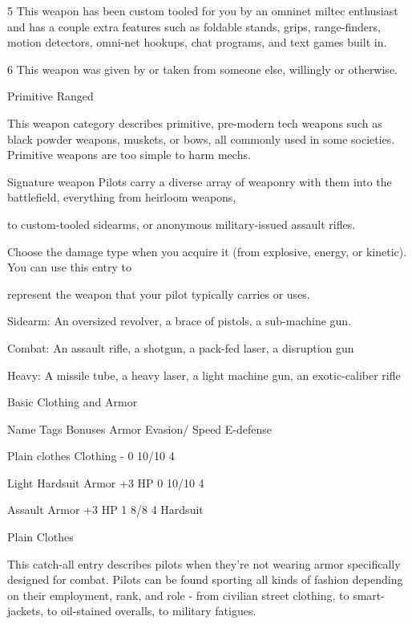  5       This weapon has been custom tooled for you by an omninet miltec enthusiast and has a couple extra  
         features such as foldable stands, grips, range-finders, motion detectors, omni-net hookups, chat programs,  
         and text games built in. 

 6       This weapon was given by or taken from someone else, willingly or otherwise. 

Primitive Ranged  

This weapon category describes primitive, pre-modern tech weapons such as black powder weapons,  
muskets, or bows, all commonly used in some societies. Primitive weapons are too simple to harm mechs.
 

Signature weapon  
Pilots carry a diverse array of weaponry with them into the battlefield, everything from heirloom weapons,  

to custom-tooled sidearms, or anonymous military-issued assault rifles. 
 

Choose the damage type when you acquire it (from explosive, energy, or kinetic). You can use this entry to  

represent the weapon that your pilot typically carries or uses. 
 

Sidearm: An oversized revolver, a brace of pistols, a sub-machine gun.
 

Combat: An assault rifle, a shotgun, a pack-fed laser, a disruption gun
 
Heavy: A missile tube, a heavy laser, a light machine gun, an exotic-caliber rifle
 

                                             Basic Clothing and Armor
 

    Name                Tags                Bonuses                              Armor        Evasion/         Speed 
                                                                                              E-defense 

    Plain clothes       Clothing            -                                    0            10/10            4 

    Light Hardsuit      Armor               +3 HP                                0            10/10            4 

    Assault             Armor               +3 HP                                1            8/8              4 
    Hardsuit 

                                                     Plain Clothes
 
This catch-all entry describes pilots when they’re not wearing armor specifically designed for  
combat. Pilots can be found sporting all kinds of fashion depending on their employment, rank,  
and role - from civilian street clothing, to smart-jackets, to oil-stained overalls, to military  
fatigues.
 

